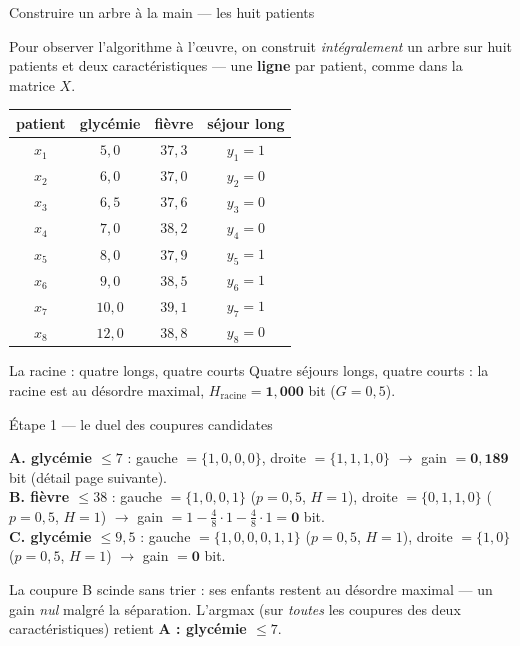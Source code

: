 \documentclass[aspectratio=169,11pt]{beamer}
\begin{document}
\begin{frame}{Construire un arbre à la main — les huit patients}
\begin{ucaddef}
{\small Pour observer l'algorithme à l'œuvre, on construit \emph{intégralement} un arbre sur huit patients et deux caractéristiques — une \textbf{ligne} par patient, comme dans la matrice $X$.}
\end{ucaddef}
\begin{ucadex}
{\scriptsize \renewcommand{\arraystretch}{0.92}\begin{tabular}{c|cc|c}
patient & glycémie & fièvre & séjour long\\\hline
$x_1$ & $5{,}0$ & $37{,}3$ & $y_1 = 1$\\
$x_2$ & $6{,}0$ & $37{,}0$ & $y_2 = 0$\\
$x_3$ & $6{,}5$ & $37{,}6$ & $y_3 = 0$\\
$x_4$ & $7{,}0$ & $38{,}2$ & $y_4 = 0$\\
$x_5$ & $8{,}0$ & $37{,}9$ & $y_5 = 1$\\
$x_6$ & $9{,}0$ & $38{,}5$ & $y_6 = 1$\\
$x_7$ & $10{,}0$ & $39{,}1$ & $y_7 = 1$\\
$x_8$ & $12{,}0$ & $38{,}8$ & $y_8 = 0$\\
\end{tabular}}
\end{ucadex}
\end{frame}

\begin{frame}{La racine : quatre longs, quatre courts}
{\small Quatre séjours longs, quatre courts : la racine est au désordre maximal, $H_{\text{racine}} = \mathbf{1{,}000}$ bit ($G = 0{,}5$).}
\end{frame}

\begin{frame}{Étape 1 — le duel des coupures candidates}
\begin{ucadex}
{\footnotesize
\textbf{A. glycémie $\le 7$} : gauche $=\{1,0,0,0\}$, droite $=\{1,1,1,0\}$ $\to$ gain $= \mathbf{0{,}189}$ bit (détail page suivante).\\[2pt]
\textbf{B. fièvre $\le 38$} : gauche $=\{1,0,0,1\}$ ($p=0{,}5$, $H=1$), droite $=\{0,1,1,0\}$ ($p=0{,}5$, $H=1$) $\to$ gain $= 1 - \tfrac{4}{8}\cdot 1 - \tfrac{4}{8}\cdot 1 = \mathbf{0}$ bit.\\[2pt]
\textbf{C. glycémie $\le 9{,}5$} : gauche $=\{1,0,0,0,1,1\}$ ($p=0{,}5$, $H=1$), droite $=\{1,0\}$ ($p=0{,}5$, $H=1$) $\to$ gain $= \mathbf{0}$ bit.}
\end{ucadex}
{\small La coupure B scinde sans trier : ses enfants restent au désordre maximal — un gain \emph{nul} malgré la séparation. L'argmax (sur \emph{toutes} les coupures des deux caractéristiques) retient \textbf{A : glycémie $\le 7$}.}
\end{frame}
\end{document}
